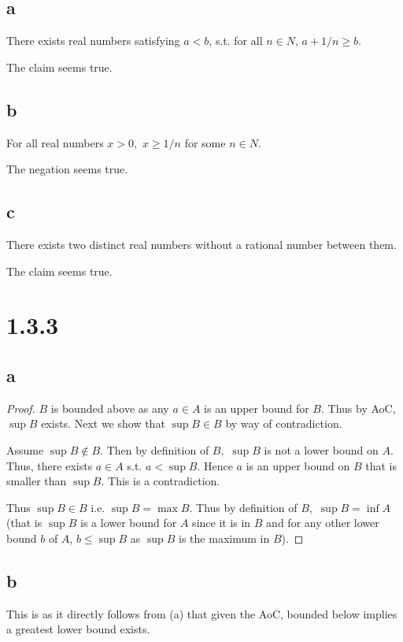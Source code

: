 \documentclass[10pt]{article}
\begin{document}
\subsection*{a}
There exists real numbers satisfying $a<b$, s.t. for all $n\in N$, $a+1/n\ge b.$

\noindent
The claim seems true.

\subsection*{b}
For all real numbers $x > 0,$ $x\ge 1/n$ for some $n\in N$.

\noindent
The negation seems true.

\subsection*{c}
There exists two distinct real numbers without a rational number between them.

\noindent
The claim seems true.

\section*{1.3.3}
\subsection*{a} 
\begin{proof}
    $B$ is bounded above as any $a\in A$ is an upper bound for $B$. Thus by AoC, $\sup B$ exists.
    Next we show that $\sup B \in B$ by way of contradiction.

    Assume $\sup B \notin B.$ Then by definition of $B,$ $\sup B$ is not a lower bound on $A.$ Thus, there exists $a\in A$ s.t. $a<\sup B.$
    Hence $a$ is an upper bound on $B$ that is smaller than $\sup B.$ This is a contradiction.

    Thus $\sup B \in B$ i.e. $\sup B = \max B.$ Thus by definition of $B,$ $\sup B = \inf A$ (that is $\sup B$ is a lower bound for $A$ since it is in $B$ and for any other lower bound $b$ of $A$, $b \le \sup B$ as $\sup B$ is the maximum in $B$).

\end{proof}

\subsection*{b}
This is as it directly follows from (a) that given the AoC, bounded below implies a greatest lower bound exists.
\end{document}
